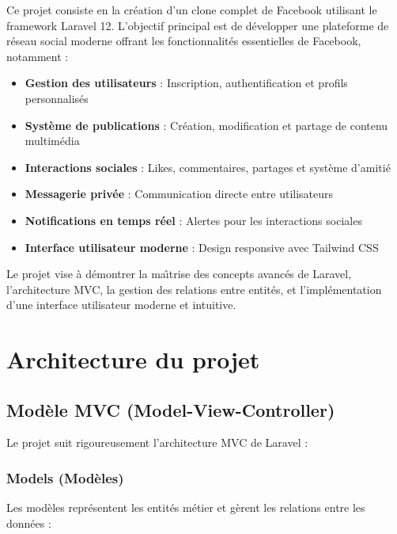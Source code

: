 \documentclass[12pt,a4paper]{article}
\begin{document}
Ce projet consiste en la cr\'eation d'un clone complet de Facebook utilisant le framework Laravel 12. L'objectif principal est de d\'evelopper une plateforme de r\'eseau social moderne offrant les fonctionnalit\'es essentielles de Facebook, notamment :

\begin{itemize}
    \item \textbf{Gestion des utilisateurs} : Inscription, authentification et profils personnalis\'es
    \item \textbf{Syst\`eme de publications} : Cr\'eation, modification et partage de contenu multim\'edia
    \item \textbf{Interactions sociales} : Likes, commentaires, partages et syst\`eme d'amiti\'e
    \item \textbf{Messagerie priv\'ee} : Communication directe entre utilisateurs
    \item \textbf{Notifications en temps r\'eel} : Alertes pour les interactions sociales
    \item \textbf{Interface utilisateur moderne} : Design responsive avec Tailwind CSS
\end{itemize}

Le projet vise \`a d\'emontrer la ma\^{\i}trise des concepts avanc\'es de Laravel, l'architecture MVC, la gestion des relations entre entit\'es, et l'impl\'ementation d'une interface utilisateur moderne et intuitive.

\section{Architecture du projet}

\subsection{Mod\`ele MVC (Model-View-Controller)}

Le projet suit rigoureusement l'architecture MVC de Laravel :

\subsubsection{Models (Mod\`eles)}
Les mod\`eles repr\'esentent les entit\'es m\'etier et g\`erent les relations entre les donn\'ees :
\end{document}
